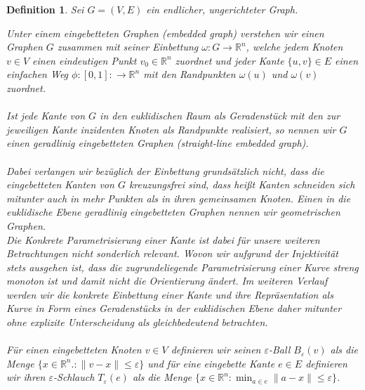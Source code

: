 \documentclass[a4paper, 12pt, twoside]{article}
\theoremstyle{Format1} %
\newtheorem{Def}{Definition}[section]       %
\begin{document}
\begin{Def}
	Sei $G=(V,E)$ ein endlicher, ungerichteter Graph.

	Unter einem \textit{eingebetteten Graphen (embedded graph)} verstehen wir einen Graphen $G$
	zusammen mit seiner \textit{Einbettung} $\omega: G \to \mathbb{R}^n$, welche
	jedem Knoten $v \in V$ einen eindeutigen Punkt $v_0 \in \mathbb{R}^n$ zuordnet und jeder Kante $\{u,v\} \in E$
	einen einfachen Weg $\phi: [0,1]: \to \mathbb{R}^n$ mit den Randpunkten $\omega(u)$ und $\omega(v)$ zuordnet.
	\\
	\\
	Ist jede Kante von $G$ in den euklidischen Raum als Geradenstück mit den zur jeweiligen Kante inzidenten Knoten als Randpunkte realisiert, so
	nennen wir $G$ einen \textit{geradlinig eingebetteten Graphen (straight-line embedded graph)}.
	\\
	\\
	Dabei verlangen wir bezüglich der Einbettung grundsätzlich nicht, dass die eingebetteten Kanten von $G$ \textit{kreuzungsfrei} sind,
	dass heißt Kanten schneiden sich mitunter auch in mehr Punkten als in ihren gemeinsamen Knoten.
	Einen in die euklidische Ebene geradlinig eingebetteten Graphen nennen wir \textit{geometrischen Graphen}.
	\\
	Die Konkrete Parametrisierung einer Kante ist dabei für unsere weiteren Betrachtungen nicht sonderlich relevant.
	Wovon wir aufgrund der Injektivität stets ausgehen ist, dass die zugrundeliegende Parametrisierung einer Kurve streng monoton ist und damit nicht die Orientierung ändert.
	Im weiteren Verlauf werden wir die konkrete Einbettung einer Kante und ihre Repräsentation als Kurve in Form eines Geradenstücks in der euklidischen
	Ebene daher mitunter ohne explizite Unterscheidung als gleichbedeutend betrachten.
	\\
	\\
	Für einen eingebetteten Knoten $v \in V$ definieren wir seinen \textit{$\varepsilon$-Ball} $B_{\varepsilon}(v)$ als die Menge
	$\{x \in \mathbb{R}^n.: \|v-x\| \leq \varepsilon\}$
	und für eine eingebette Kante $e \in E$ definieren wir ihren \textit{$\varepsilon$-Schlauch} $T_{\varepsilon}(e)$ als die Menge
	$\{x \in \mathbb{R}^n: \min_{a \in e}\|a-x\| \leq \varepsilon\}$.
\end{Def}
\end{document}
